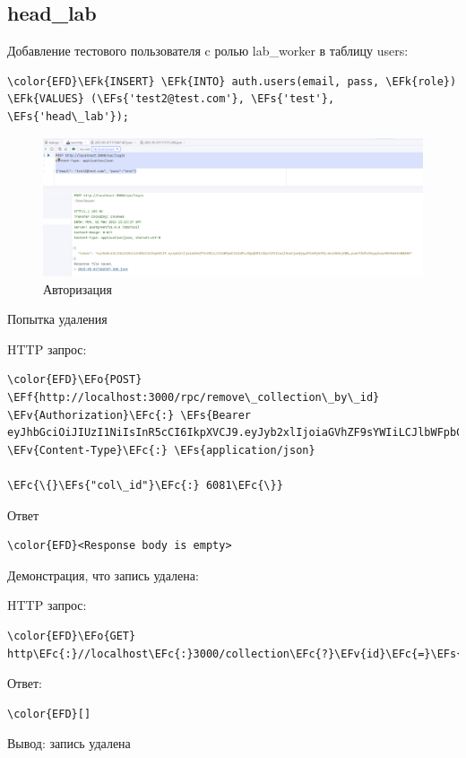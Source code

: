 \documentclass[14pt]{extarticle}
\newcommand{\EFc}[1]{\textcolor{EFc}{#1}} %
\newcommand{\EFs}[1]{\textcolor{EFs}{#1}} %
\newcommand{\EFk}[1]{\textcolor{EFk}{#1}} %
\newcommand{\EFf}[1]{\textcolor{EFf}{#1}} %
\newcommand{\EFv}[1]{\textcolor{EFv}{#1}} %
\newcommand{\EFo}[1]{\textcolor{EFo}{#1}} %
\begin{document}
\subsection{head\_​lab}
\label{sec:org7304be1}


Добавление тестового пользователя c ролью lab\_​worker в таблицу users:
\begin{Code}
\begin{Verbatim}
\color{EFD}\EFk{INSERT} \EFk{INTO} auth.users(email, pass, \EFk{role}) \EFk{VALUES} (\EFs{'test2@test.com'}, \EFs{'test'}, \EFs{'head\_lab'});
\end{Verbatim}
\end{Code}


\begin{figure}[H]
\centering
\includegraphics[width=.9\linewidth]{images/2023-05-01_18-24-03_screenshot.png}
\caption{Авторизация}
\end{figure}


Попытка удаления

HTTP запрос:
\begin{Code}
\begin{Verbatim}
\color{EFD}\EFo{POST} \EFf{http://localhost:3000/rpc/remove\_collection\_by\_id}
\EFv{Authorization}\EFc{:} \EFs{Bearer eyJhbGciOiJIUzI1NiIsInR5cCI6IkpXVCJ9.eyJyb2xlIjoiaGVhZF9sYWIiLCJlbWFpbCI6InRlc3QyQHRlc3QuY29tIiwiZXhwIjoxNjgyOTU4MjA3fQ.mkzS0XwjVWW\_yook7JUPx3UyypScqrWh9mkKCmWWAN0}
\EFv{Content-Type}\EFc{:} \EFs{application/json}

\EFc{\{}\EFs{"col\_id"}\EFc{:} 6081\EFc{\}}
\end{Verbatim}
\end{Code}

Ответ
\begin{Code}
\begin{Verbatim}
\color{EFD}<Response body is empty>
\end{Verbatim}
\end{Code}

Демонстрация, что запись удалена:

HTTP запрос:
\begin{Code}
\begin{Verbatim}
\color{EFD}\EFo{GET} http\EFc{:}//localhost\EFc{:}3000/collection\EFc{?}\EFv{id}\EFc{=}\EFs{eq.6081}
\end{Verbatim}
\end{Code}

Ответ:
\begin{Code}
\begin{Verbatim}
\color{EFD}[]
\end{Verbatim}
\end{Code}

Вывод: запись удалена
\end{document}
